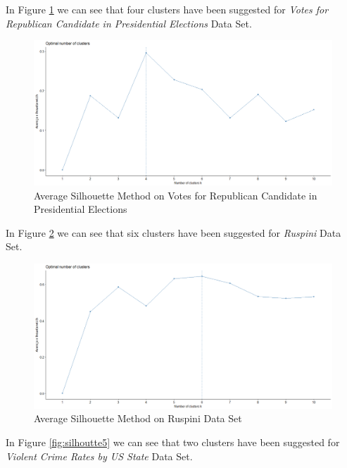 \begin{itemize}
\vspace{15mm}

In Figure \ref{fig:silhoutte3} we can see that four clusters have been suggested for \textit{Votes for Republican Candidate in Presidential Elections} Data Set.

\begin{figure}[h!]
  \centering
  \includegraphics[scale=1.3]{figures/results/republican/silhouette.png}
  \caption{Average Silhouette Method on Votes for Republican Candidate in Presidential Elections}
  \label{fig:silhoutte3}
\end{figure}

\newpage

In Figure \ref{fig:silhoutte4} we can see that six clusters have been suggested for \textit{Ruspini} Data Set.

\begin{figure}[h!]
  \centering
  \includegraphics[scale=1.3]{figures/results/ruspini/silhouette.png}
  \caption{Average Silhouette Method on Ruspini Data Set}
  \label{fig:silhoutte4}
\end{figure}

\vspace{15mm}

In Figure \ref{fig:silhoutte5} we can see that two clusters have been suggested for \textit{Violent Crime Rates by US State} Data Set.


\end{itemize}
